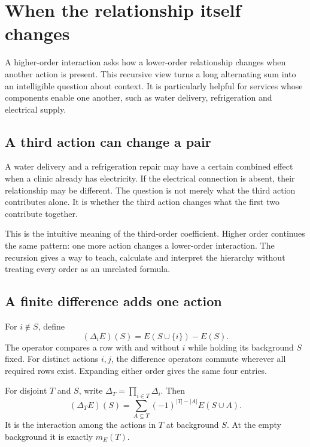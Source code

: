 \chapter{When the relationship itself changes}\label{ch:recursion}

A higher-order interaction asks how a lower-order relationship changes when another action is present. This recursive view turns a long alternating sum into an intelligible question about context. It is particularly helpful for services whose components enable one another, such as water delivery, refrigeration and electrical supply.


\section{A third action can change a pair}
A water delivery and a refrigeration repair may have a certain combined effect when a clinic already has electricity. If the electrical connection is absent, their relationship may be different. The question is not merely what the third action contributes alone. It is whether the third action changes what the first two contribute together.

This is the intuitive meaning of the third-order coefficient. Higher order continues the same pattern: one more action changes a lower-order interaction. The recursion gives a way to teach, calculate and interpret the hierarchy without treating every order as an unrelated formula.

\section{A finite difference adds one action}
For $i\notin S$, define
\begin{equation}
 (\Delta_iE)(S)=E(S\cup\{i\})-E(S).
\end{equation}
The operator compares a row with and without $i$ while holding its background $S$ fixed. For distinct actions $i,j$, the difference operators commute wherever all required rows exist. Expanding either order gives the same four entries.

For disjoint $T$ and $S$, write $\Delta_T=\prod_{i\in T}\Delta_i$. Then
\begin{equation}\label{eq:context-difference}
 (\Delta_TE)(S)=\sum_{A\subseteq T}(-1)^{|T|-|A|}E(S\cup A).
\end{equation}
It is the interaction among the actions in $T$ at background $S$. At the empty background it is exactly $m_E(T)$.

